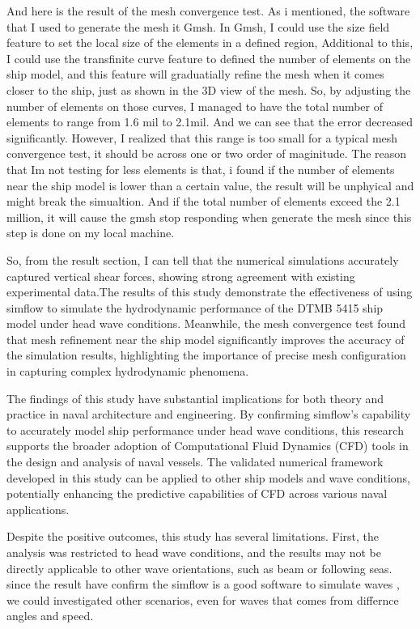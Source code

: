 \documentclass[17pt]{extarticle} %
\begin{document}
And here is the result of the mesh convergence test. As i mentioned, the software that I used to generate the mesh it
Gmsh. In Gmsh, I could use the size field feature to set the local size of the elements in a defined region, Additional to this,
I could use the transfinite curve feature to defined the number of elements on the ship model, and this feature will
graduatially refine the mesh when it comes closer to the ship, just as shown in the 3D view of the mesh. So, by
adjusting the number of elements on those curves, I managed to have the total number of elements to range
from  1.6 mil to 2.1mil. And we can see that the error decreased significantly. However, I realized that this
range is too small for a typical mesh convergence test, it should be across one or two order of maginitude. The reason
that Im not testing for less elements is that, i found if the number of elements near the ship model is lower than
a certain value, the result will be unphyical and might break the simualtion. And if the total number of elements
exceed the 2.1 million, it will cause the gmsh stop responding when generate the mesh since this step is done on my local machine.

So, from the result section, I can tell that the numerical simulations accurately captured vertical shear forces,
showing strong agreement with existing experimental data.The results of this study demonstrate the effectiveness of using simflow to simulate the
hydrodynamic performance of the DTMB 5415 ship model under head wave conditions. Meanwhile, the mesh convergence
test found that mesh refinement near the ship model significantly improves the accuracy of
the simulation results, highlighting the importance of precise mesh configuration in capturing
complex hydrodynamic phenomena.

The findings of this study have substantial implications for both theory and practice in naval
architecture and engineering. By confirming simflow’s capability to accurately model ship
performance under head wave conditions, this research supports the broader adoption of
Computational Fluid Dynamics (CFD) tools in the design and analysis of naval vessels. The
validated numerical framework developed in this study can be applied to other ship models and
wave conditions, potentially enhancing the predictive capabilities of CFD across various naval
applications.

Despite the positive outcomes, this study has several limitations. First, the analysis was restricted
to head wave conditions, and the results may not be directly applicable to other wave orientations,
such as beam or following seas. since the result have confirm the simflow is a good software to simulate waves
, we could investigated other scenarios, even for waves that comes from differnce angles and speed.
\end{document}
